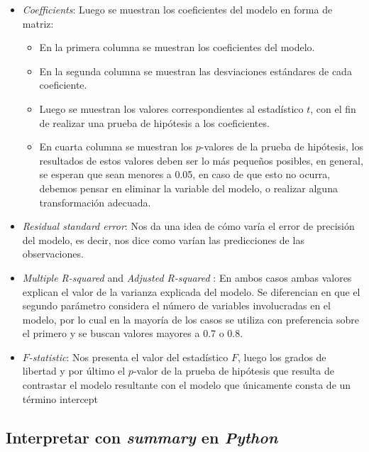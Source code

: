 \documentclass[12pt,]{krantz}
\providecommand{\tightlist}{%
  \setlength{\itemsep}{0pt}\setlength{\parskip}{0pt}}
\begin{document}
\begin{itemize}
\item
  \emph{Coefficients}: Luego se muestran los coeficientes del modelo en forma de matriz:

  \begin{itemize}
  \tightlist
  \item
    En la primera columna se muestran los coeficientes del modelo.
  \item
    En la segunda columna se muestran las desviaciones estándares de cada coeficiente.
  \item
    Luego se muestran los valores correspondientes al estadístico \(t\), con el fin de realizar una prueba de hipótesis a los coeficientes.
  \item
    En cuarta columna se muestran los \(p\)-valores de la prueba de hipótesis, los resultados de estos valores deben ser lo más pequeños posibles, en general, se esperan que sean menores a 0.05, en caso de que esto no ocurra, debemos pensar en eliminar la variable del modelo, o realizar alguna transformación adecuada.
  \end{itemize}
\item
  \emph{Residual standard error}: Nos da una idea de cómo varía el error de precisión del modelo, es decir, nos dice como varían las predicciones de las observaciones.
\item
  \emph{Multiple R-squared} and \emph{Adjusted R-squared} : En ambos casos ambas valores explican el valor de la varianza explicada del modelo. Se diferencian en que el segundo parámetro considera el número de variables involucradas en el modelo, por lo cual en la mayoría de los casos se utiliza con preferencia sobre el primero y se buscan valores mayores a 0.7 o 0.8.
\item
  \emph{\(F\)-statistic}: Nos presenta el valor del estadístico \(F\), luego los grados de libertad y por último el \(p\)-valor de la prueba de hipótesis que resulta de contrastar el modelo resultante con el modelo que únicamente consta de un término intercept
\end{itemize}

\hypertarget{interpretar-con-summary-en-python}{%
\subsection{\texorpdfstring{Interpretar con \emph{summary} en \emph{Python}}{Interpretar con summary en Python}}\label{interpretar-con-summary-en-python}}
\end{document}
